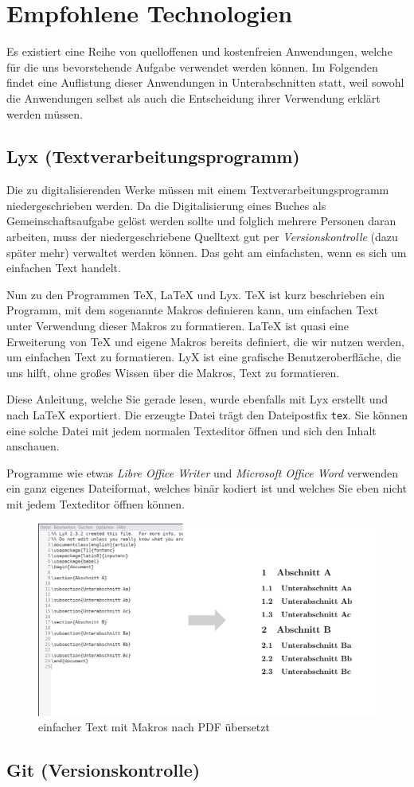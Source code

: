 
\section{Empfohlene Technologien}

Es existiert eine Reihe von quelloffenen und kostenfreien Anwendungen,
welche für die uns bevorstehende Aufgabe verwendet werden können.
Im Folgenden findet eine Auflistung dieser Anwendungen in Unterabschnitten
statt, weil sowohl die Anwendungen selbst als auch die Entscheidung
ihrer Verwendung erklärt werden müssen.

\subsection{Lyx (Textverarbeitungsprogramm)}

Die zu digitalisierenden Werke müssen mit einem Textverarbeitungsprogramm
niedergeschrieben werden. Da die Digitalisierung eines Buches als
Gemeinschaftsaufgabe gelöst werden sollte und folglich mehrere Personen
daran arbeiten, muss der niedergeschriebene Quelltext gut per \emph{Versionskontrolle}
(dazu später mehr) verwaltet werden können. Das geht am einfachsten,
wenn es sich um einfachen Text handelt.

Nun zu den Programmen \TeX , \LaTeX{} und Lyx. \TeX{} ist kurz beschrieben
ein Programm, mit dem sogenannte Makros definieren kann, um einfachen
Text unter Verwendung dieser Makros zu formatieren. \LaTeX{} ist quasi
eine Erweiterung von \TeX{} und eigene Makros bereits definiert, die
wir nutzen werden, um einfachen Text zu formatieren. LyX ist eine
grafische Benutzeroberfläche, die uns hilft, ohne großes Wissen über
die Makros, Text zu formatieren.

Diese Anleitung, welche Sie gerade lesen, wurde ebenfalls mit Lyx
erstellt und nach \LaTeX{} exportiert. Die erzeugte Datei trägt den
Dateipostfix \texttt{tex}. Sie können eine solche Datei mit jedem
normalen Texteditor öffnen und sich den Inhalt anschauen.

Programme wie etwas \emph{Libre Office Writer} und \emph{Microsoft
Office Word} verwenden ein ganz eigenes Dateiformat, welches binär
kodiert ist und welches Sie eben nicht mit jedem Texteditor öffnen
können.

\begin{figure}
\centering{}\includegraphics{image_1}\caption{einfacher Text mit Makros nach PDF übersetzt}
\end{figure}


\subsection{Git (Versionskontrolle)}
